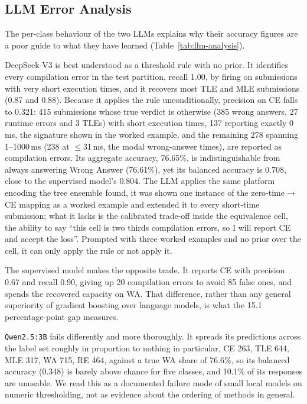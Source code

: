 \documentclass[acmsmall]{acmart}
\begin{document}
\subsection{LLM Error Analysis}\label{sec:llm-analysis}

The per-class behaviour of the two LLMs explains why their accuracy figures are
a poor guide to what they have learned (Table~\ref{tab:llm-analysis}).

DeepSeek-V3 is best understood as a threshold rule with no prior. It identifies
every compilation error in the test partition, recall 1.00, by firing on
submissions with very short execution times, and it recovers most TLE and MLE
submissions (0.87 and 0.88). Because it applies the rule unconditionally,
precision on CE falls to 0.321: 415 submissions whose true verdict is otherwise
(385 wrong answers, 27 runtime errors and 3 TLEs) with short execution times,
137 reporting exactly 0\,ms, the signature shown in the worked example, and the
remaining 278 spanning 1--1000\,ms (238 at $\le$31\,ms, the modal wrong-answer
 times), are reported as compilation errors. Its aggregate accuracy, 76.65\%, is
indistinguishable from always answering Wrong Answer (76.61\%), yet its balanced
accuracy is 0.708, close to the supervised model's 0.804. The LLM applies the
same platform encoding the tree ensemble found, it was shown one instance of
the zero-time$\rightarrow$CE mapping as a worked example and extended it to
every short-time submission; what it lacks is the calibrated trade-off inside
the equivalence cell, the ability to say ``this cell is two thirds compilation
errors, so I will report CE and accept the loss''. Prompted with three worked
examples and no prior over the cell, it can only apply the rule or not apply
it.

The supervised model makes the opposite trade. It reports CE with precision
0.67 and recall 0.90, giving up 20 compilation errors to avoid 85 false ones,
and spends the recovered capacity on WA. That difference, rather than any
general superiority of gradient boosting over language models, is what the
15.1 percentage-point gap measures.

\texttt{Qwen2.5:3B} fails differently and more thoroughly. It spreads its
predictions across the label set roughly in proportion to nothing in
particular, CE 263, TLE 644, MLE 317, WA 715, RE 464, against a true WA share
of 76.6\%, so its balanced accuracy (0.348) is barely above chance for five
classes, and 10.1\% of its responses are unusable. We read this as a documented
failure mode of small local models on numeric thresholding, not as evidence
about the ordering of methods in general.
\end{document}
